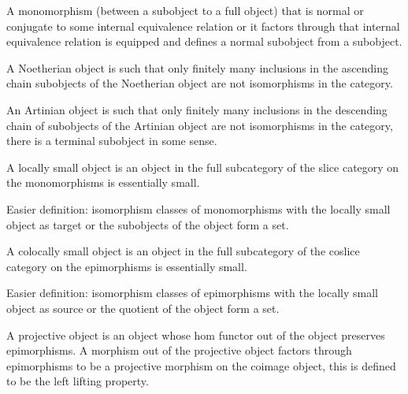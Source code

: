 \begin{definition}
    \label{definition-normal-subobject}
    A monomorphism (between a subobject to a full object) that is normal or conjugate to some internal equivalence relation or it factors through that internal equivalence relation is equipped and defines a normal subobject from a subobject.
\end{definition}

\begin{definition}
    \label{definition-noetherian-object}
    A Noetherian object is such that only finitely many inclusions in the ascending chain subobjects of the Noetherian object are not isomorphisms in the category.
\end{definition}

\begin{definition}
    \label{definition-artinian-object}
    An Artinian object is such that only finitely many inclusions in the descending chain of subobjects of the Artinian object are not isomorphisms in the category, there is a terminal subobject in some sense.
\end{definition}

\begin{definition}
    \label{definition-locally-small-object-slice-cat}
    A locally small object is an object in the full subcategory of the slice category on the monomorphisms is essentially small.

    Easier definition: isomorphism classes of monomorphisms with the locally small object as target or the subobjects of the object form a set.
\end{definition}

\begin{definition}
    \label{definition-colocally-small-object-slice-cat}
    A colocally small object is an object in the full subcategory of the coslice category on the epimorphisms is essentially small.

    Easier definition: isomorphism classes of epimorphisms with the locally small object as source or the quotient of the object form a set.
\end{definition}

\begin{definition}
    \label{definition-projective-object}
    A projective object is an object whose hom functor out of the object preserves epimorphisms. A morphism out of the projective object factors through epimorphisms to be a projective morphism on the coimage object, this is defined to be the left lifting property.
\end{definition}

